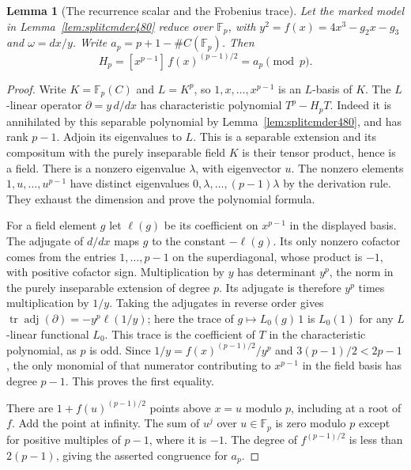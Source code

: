 \documentclass[a4paper,11pt]{article}
\newtheorem{lemma}[proposition]{Lemma}
\theoremstyle{definition}
\theoremstyle{remark}
\numberwithin{equation}{section}
\begin{document}
\begin{lemma}[The recurrence scalar and the Frobenius trace]\leavevmode
\label{lem:frobtrace483}
Let the marked model in Lemma~\ref{lem:splitcmder480} reduce
over \(\mathbb F_p\), with \(y^2=f(x)=4x^3-g_2x-g_3\) and
\(\omega=dx/y\). Write \(a_p=p+1-\#C(\mathbb F_p)\). Then
\[
           H_p=[x^{p-1}]\,f(x)^{(p-1)/2}=a_p\pmod p .
\]
\end{lemma}
\begin{proof}
Write \(K=\mathbb F_p(C)\) and \(L=K^p\), so
\(1,x,\ldots,x^{p-1}\) is an \(L\)-basis of \(K\).
The \(L\)-linear operator \(\partial=y\,d/dx\) has
characteristic polynomial \(T^p-H_pT\).
Indeed it is annihilated by this separable polynomial by
Lemma~\ref{lem:splitcmder480}, and has rank \(p-1\).
Adjoin its eigenvalues to \(L\). This is a separable extension
and its compositum with the purely inseparable field \(K\) is
their tensor product, hence is a field. There is a nonzero
eigenvalue \(\lambda\), with eigenvector \(u\). The nonzero
elements \(1,u,\ldots,u^{p-1}\) have distinct eigenvalues
\(0,\lambda,\ldots,(p-1)\lambda\) by the derivation rule.
They exhaust the dimension and prove the polynomial formula.

For a field element \(g\) let \(\ell(g)\) be its coefficient
on \(x^{p-1}\) in the displayed basis. The adjugate of \(d/dx\)
maps \(g\) to the constant \(-\ell(g)\). Its only nonzero
cofactor comes from the entries \(1,\ldots,p-1\) on the
superdiagonal, whose product is \(-1\), with positive cofactor
sign. Multiplication by \(y\) has determinant \(y^p\), the norm
in the purely inseparable extension of degree \(p\). Its adjugate
is therefore \(y^p\) times multiplication by \(1/y\).
Taking the adjugates in reverse order gives
\(\operatorname{tr}\operatorname{adj}(\partial)=-y^p\ell(1/y)\);
here the trace of \(g\mapsto L_0(g)\,1\) is \(L_0(1)\) for
any \(L\)-linear functional \(L_0\).
This trace is the coefficient of \(T\) in the characteristic
polynomial, as \(p\) is odd. Since
\(1/y=f(x)^{(p-1)/2}/y^p\) and
\(3(p-1)/2<2p-1\), the only monomial of that numerator contributing
to \(x^{p-1}\) in the field basis has degree \(p-1\).
This proves the first equality.

There are \(1+f(u)^{(p-1)/2}\) points above \(x=u\) modulo
\(p\), including at a root of \(f\). Add the point at infinity.
The sum of \(u^j\) over \(u\in\mathbb F_p\) is zero modulo \(p\)
except for positive multiples of \(p-1\), where it is \(-1\).
The degree of \(f^{(p-1)/2}\) is less than \(2(p-1)\), giving
the asserted congruence for \(a_p\).
\end{proof}
\end{document}
